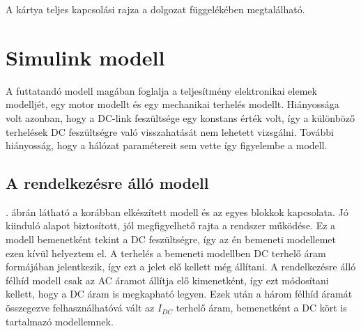 A kártya teljes kapcsolási rajza a dolgozat függelékében megtalálható.

\section{Simulink modell}

A futtatandó modell magában foglalja a teljesítmény elektronikai elemek modelljét, egy motor modellt és egy mechanikai terhelés modellt. Hiányossága volt azonban, hogy a DC-link feszültsége egy konstans érték volt, így a különböző terhelések DC feszültségre való visszahatását nem lehetett vizsgálni. További hiányosság, hogy a hálózat paramétereit sem vette így figyelembe a modell.

\subsection{A rendelkezésre álló modell}

. ábrán látható a korábban elkészített modell és az egyes blokkok kapcsolata. Jó kiinduló alapot biztosított, jól megfigyelhető rajta a rendszer működése. Ez a modell bemenetként tekint a DC feszültségre, így az én bemeneti modellemet ezen kívül helyeztem el. A terhelés a bemeneti modellben DC terhelő áram formájában jelentkezik, így ezt a jelet elő kellett még állítani. A rendelkezésre álló félhíd modell csak az AC áramot állítja elő kimenetként, így ezt módosítani kellett, hogy a DC áram is megkapható legyen. Ezek után a három félhíd áramát összegezve felhasználhatóvá vált az $I_{DC}$ terhelő áram, bemenetként a DC kört is tartalmazó modellemnek.


